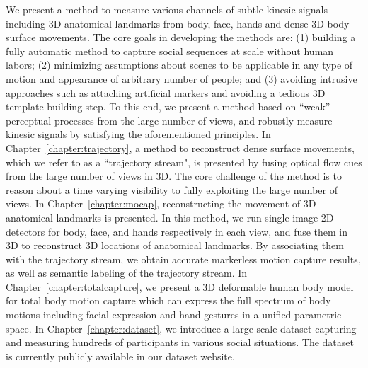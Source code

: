 We present a method to measure various channels of subtle kinesic signals including 3D anatomical landmarks from body, face, hands and dense 3D body surface movements. The core goals in developing the methods are: (1) building a fully automatic method to capture social sequences at scale without human labors; (2) minimizing assumptions about scenes to be applicable in any type of motion and appearance of arbitrary number of people; and (3) avoiding intrusive approaches such as attaching artificial markers and avoiding a tedious 3D template building step. To this end, we present a method based on ``weak'' perceptual processes from the large number of views, and robustly measure kinesic signals by satisfying the aforementioned principles. In Chapter~\ref{chapter:trajectory}, a method to reconstruct dense surface movements, which we refer to as a ``trajectory stream", is presented by fusing optical flow cues from the large number of views in 3D. The core challenge of the method is to reason about a time varying visibility to fully exploiting the large number of views. In Chapter~\ref{chapter:mocap}, reconstructing the movement of 3D anatomical landmarks is presented. In this method, we run single image 2D detectors for body, face, and hands respectively in each view, and fuse them in 3D to reconstruct 3D locations of anatomical landmarks. By associating them with the trajectory stream, we obtain accurate markerless motion capture results, as well as semantic labeling of the trajectory stream.  In Chapter~\ref{chapter:totalcapture}, we present a 3D deformable human body model for total body motion capture which can express the full spectrum of body motions including facial expression and hand gestures in a unified parametric space. In Chapter~\ref{chapter:dataset}, we introduce a large scale dataset capturing and measuring hundreds of participants in various social situations. The dataset is currently publicly available in our dataset website. 


